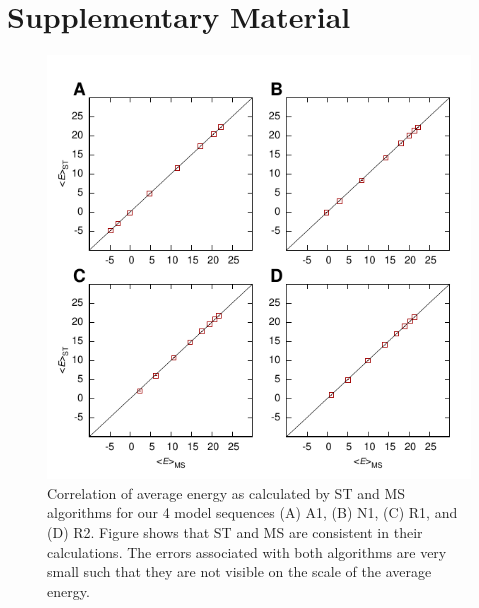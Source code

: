 \section{Supplementary Material}

\begin{figure}
\includegraphics[width=14cm]{meanE}
\caption{ Correlation of average energy as calculated by ST and MS algorithms for our 4 model sequences (A) A1, (B) N1, (C) R1, and (D) R2. Figure shows that  ST and MS are consistent in their calculations. The errors associated with both algorithms are very small such that they are not visible on the scale of the average energy.}
\end{figure}
